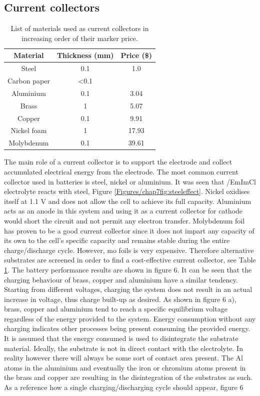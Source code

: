 \subsection*{Current collectors}
\begin{table}
\caption{List of materials used as current collectors in increasing order of their marker price.} \label{t2}
\begin{center}
 \begin{tabular}{|ccc|} 
 \hline
 \textbf{Material} & \textbf{Thickness (mm)} & \textbf{Price (\$)} \\
 \hline
 \hline
Steel & 0.1 & 1.0 \\ 
Carbon paper  & <0.1 &  \\
Aluminium & 0.1 & 3.04 \\
Brass & 1 & 5.07 \\
Copper & 0.1 & 9.91 \\ 
Nickel foam & 1 & 17.93 \\
Molybdenum & 0.1 & 39.61 \\
\hline
\end{tabular}
\end{center}
\end{table}
The main role of a current collector is to support the electrode and collect accumulated electrical energy from the electrode. The most common current collector used in batteries is steel, nickel or aluminium. It was seen that /EmImCl electrolyte reacts with steel, Figure \ref{Figures/chap7fig:steeleffect}. Nickel oxidises itself at 1.1 V and does not allow the cell to achieve its full capacity. Aluminium acts as an anode in this system and using it as a current collector for cathode would short the circuit and not permit any electron transfer. Molybdenum foil has proven to be a good current collector since it does not impart any capacity of its own to the cell's specific capacity and remains stable during the entire charge/discharge cycle. However, mo foils is very expensive. Therefore alternative substrates are screened in order to find a cost-effective current collector, see Table \ref{t2}. 
The battery performance results are shown in figure 6. It can be seen that the charging behaviour of brass, copper and aluminium have a similar tendency. Starting from different voltages, charging the system does not result in an actual increase in voltage, thus charge built-up as desired. As shown in figure 6 a), brass, copper and aluminium tend to reach a specific equilibrium voltage regardless of the energy provided to the system. Energy consumption without any charging indicates other processes being present consuming the provided energy. It is assumed that the energy consumed is used to disintegrate the substrate material. Ideally, the substrate is not in direct contact with the electrolyte. In reality however there will always be some sort of contact area present. The Al atoms in the aluminium and eventually the iron or chromium atoms present in the brass and copper are resulting in the disintegration of the substrates as such. As a reference how a single charging/discharging cycle should appear, figure 6
